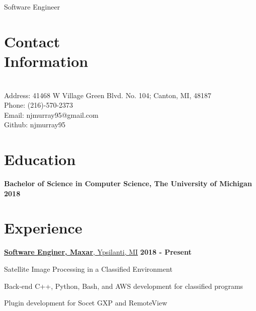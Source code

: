 \documentclass[margin,line]{resume}
\begin{document}
\begin{resume}

    \hfill {\Huge Software Engineer}\\

    \section{\mysidestyle Contact\\Information}
    \hfill \\

    Address: 41468 W Village Green Blvd. No. 104; Canton, MI, 48187 \\
    Phone: (216)-570-2373 \\
    Email: njmurray95@gmail.com \\
    Github: njmurray95

    \section{\mysidestyle Education}
    \hfill

    \textbf{Bachelor of Science in Computer Science, The University of Michigan}
    \hfill \textbf{\hfill 2018}

    \section{\mysidestyle Experience}
    \hfill

    \underline{\textbf{Software Enginer, Maxar}, Ypsilanti, MI}
    \hfill \textbf{\hfill 2018 - Present} \\

    \begin{list2}
    \item Satellite Image Processing in a Classified Environment
    \item Back-end C++, Python, Bash, and AWS development for classified programs
    \item Plugin development for Socet GXP and RemoteView
    \end{list2}


\end{resume}
\end{document}
